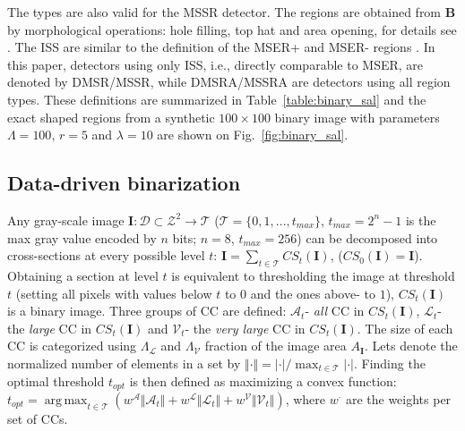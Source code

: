 \documentclass{article}
\def\B{{\mathbf B}}
\def\I{{\mathbf I}}
\def\mcT{{\mathcal{T}}}
\def\mcD{{\mathcal{D}}}
\def\mcA{{\mathcal{A}}}
\def\mcL{{\mathcal{L}}}
\def\mcV{{\mathcal{V}}}
\DeclareMathOperator*{\argmax}{arg\,max}
\begin{document}
The types are also valid for the MSSR detector. The regions are obtained from $\B$ by morphological operations: hole filling, top hat and area opening, for details see \cite{RangMSSR06, RangHumpb06}. The ISS are similar to the definition of the MSER+ and MSER- regions \cite{Matas2002BMVC}. In this paper, detectors using only ISS, i.e., directly comparable to MSER, are denoted by DMSR/MSSR, while DMSRA/MSSRA are detectors using all region types. These definitions are summarized in Table~\ref{table:binary_sal} and the exact shaped regions from a synthetic $100 \times 100$ binary image with parameters $\Lambda=100$, $r=5$ and $\lambda = 10$ are shown on Fig.~\ref{fig:binary_sal}.

\subsection{Data-driven binarization}
\label{ssec:binarize}
Any gray-scale image  $\I: \mcD \subset \mathcal{Z}^2 \rightarrow \mcT $ ($\mcT = \{0,1, ..., t_{max}\}$, $t_{max} = 2^n-1$ is the max gray value encoded by $n$ bits; $n=8$, $t_{max}=256$) can be decomposed into cross-sections at
every possible level $t$:  $\I = \sum_{t \in \mcT}CS_t(\I)$, 
($CS_0(\I) = \I$). Obtaining a section at level $t$ is equivalent to thresholding the image at threshold $t$ (setting all pixels with values below $t$ to $0$ and the ones above- to $1$), $CS_t(\I)$ is a binary image. 
Three groups of CC are defined: $\mcA_t$- {\em all} CC in $CS_t(\I)$, $\mcL_t$- the {\em large} CC in $CS_t(\I)$ and 
$\mcV_t$- the {\em very large} CC in $CS_t(\I)$.  The size of each CC is categorized using $\Lambda_{\mcL}$ and $\Lambda_{\mcV}$ fraction of the image area $A_{\I}$. Lets denote the normalized number of elements in a set by $\Vert \cdot \Vert = |\cdot| / \max_{t \in \mcT}|\cdot|$.
Finding the optimal threshold $t_{opt}$ is then defined as maximizing a convex function:
$t_{opt} = \argmax_{t \in \mcT}( w^{\mcA} \Vert \mcA_t \Vert + w^{\mcL} \Vert \mcL_t \Vert + w^{\mcV} \Vert \mcV_t \Vert )$,
where $w^{\cdot}$ are the weights per set of CCs.  
\end{document}
